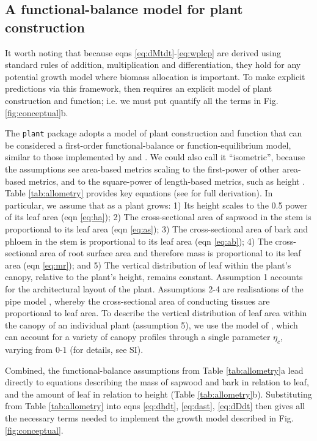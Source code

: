 \documentclass[9pt,twocolumn,twoside]{pnas-new}
\newcommand{\plant}{\texttt{plant}}
\begin{document}
\subsection{A functional-balance model for plant construction}

It worth noting that because eqns \ref{eq:dMtdt}-\ref{eq:wplcp} are derived using standard rules of addition, multiplication and differentiation, they hold for any potential growth model where biomass allocation is important. To make explicit predictions via this framework, then requires an explicit model of plant construction and function; i.e. we must put quantify all the terms in Fig. \ref{fig:conceptual}b.

The {\plant} package adopts a model of plant construction and function that can be considered a first-order functional-balance or function-equilibrium model, similar to those implemented by \citep{Makela-1997} and \citep{Moorcroft-2001}. We could also call it ``isometric'', because the assumptions see area-based metrics scaling to the first-power of other area-based metrics, and to the square-power of length-based metrics, such as height \citep{Huxley-1932}. Table \ref{tab:allometry} provides key equations (see \citep{Falster-2016} for full derivation). In particular, we assume that as a plant grows:
1) Its height scales to the 0.5 power of its leaf area (eqn \ref{eq:ha});
2) The cross-sectional area of sapwood in the stem is proportional to its leaf area (eqn \ref{eq:as});
3) The cross-sectional area of bark and phloem in the stem  is proportional to its leaf area (eqn \ref{eq:ab});
4) The cross-sectional area of root surface area and therefore mass is proportional to its leaf area (eqn \ref{eq:mr}); and
5) The vertical distribution of leaf within the plant's canopy, relative to the plant's height, remains constant.
Assumption 1 accounts for the architectural layout of the plant. Assumptions 2-4 are realisations of the pipe model \citep{Shinozaki-1964}, whereby the cross-sectional area of conducting tissues are proportional to leaf area. To describe the vertical distribution of leaf area within the canopy of an individual plant (assumption 5), we use the model of \citep{Yokozawa-1995}, which can account for a variety of canopy profiles through a single parameter $\eta_c$, varying from 0-1 (for details, see SI).

Combined, the functional-balance assumptions from Table \ref{tab:allometry}a lead directly to equations describing the mass of sapwood and bark in relation to leaf, and the amount of leaf in relation to height (Table \ref{tab:allometry}b). Substituting from Table \ref{tab:allometry} into eqns \ref{eq:dhdt}, \ref{eq:dast}, \ref{eq:dDdt} then gives all the necessary terms needed to implement the growth model described in Fig. \ref{fig:conceptual}.
\end{document}
